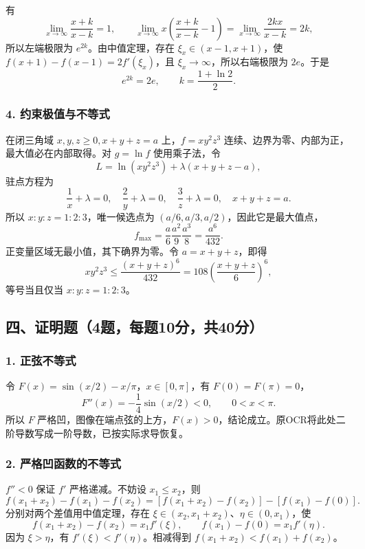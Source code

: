 \documentclass[11pt,fontset=fandol]{ctexart}
\begin{document}
有 \[
\lim_{x\to\infty}\frac{x+k}{x-k}=1,\qquad
\lim_{x\to\infty}x\left(\frac{x+k}{x-k}-1\right)
=\lim_{x\to\infty}\frac{2kx}{x-k}=2k,
\] 所以左端极限为 \(e^{2k}\)。由中值定理，存在 \(\xi_x\in(x-1,x+1)\)，使
\(f(x+1)-f(x-1)=2f'(\xi_x)\)，且 \(\xi_x\to\infty\)，所以右端极限为
\(2e\)。于是 \[
e^{2k}=2e,\qquad k=\frac{1+\ln2}{2}.
\]

\subsubsection{4.
约束极值与不等式}\label{ux7ea6ux675fux6781ux503cux4e0eux4e0dux7b49ux5f0f}

在闭三角域 \(x,y,z\ge0,x+y+z=a\) 上，\(f=xy^2z^3\)
连续、边界为零、内部为正，最大值必在内部取得。对 \(g=\ln f\)
使用乘子法，令 \[
L=\ln(xy^2z^3)+\lambda(x+y+z-a),
\] 驻点方程为 \[
\frac1x+\lambda=0,\quad\frac2y+\lambda=0,\quad
\frac3z+\lambda=0,\quad x+y+z=a.
\] 所以 \(x:y:z=1:2:3\)，唯一候选点为
\((a/6,a/3,a/2)\)，因此它是最大值点， \[
f_{\max}=\frac a6\frac{a^2}{9}\frac{a^3}{8}=\frac{a^6}{432}.
\] 正变量区域无最小值，其下确界为零。令 \(a=x+y+z\)，即得 \[
xy^2z^3\le\frac{(x+y+z)^6}{432}
=108\left(\frac{x+y+z}{6}\right)^6,
\] 等号当且仅当 \(x:y:z=1:2:3\)。

\subsection{四、证明题（4题，每题10分，共40分）}\label{ux56dbux8bc1ux660eux98984ux9898ux6bcfux989810ux5206ux517140ux5206}

\subsubsection{1. 正弦不等式}\label{ux6b63ux5f26ux4e0dux7b49ux5f0f}

令 \(F(x)=\sin(x/2)-x/\pi\)，\(x\in[0,\pi]\)，有 \(F(0)=F(\pi)=0\)， \[
F''(x)=-\frac14\sin(x/2)<0,\qquad 0<x<\pi.
\] 所以 \(F\)
严格凹，图像在端点弦的上方，\(F(x)>0\)，结论成立。原OCR将此处二阶导数写成一阶导数，已按实际求导恢复。

\subsubsection{2.
严格凹函数的不等式}\label{ux4e25ux683cux51f9ux51fdux6570ux7684ux4e0dux7b49ux5f0f}

\(f''<0\) 保证 \(f'\) 严格递减。不妨设 \(x_1\le x_2\)，则 \[
f(x_1+x_2)-f(x_1)-f(x_2)
=[f(x_1+x_2)-f(x_2)]-[f(x_1)-f(0)].
\] 分别对两个差值用中值定理，存在
\(\xi\in(x_2,x_1+x_2)\)、\(\eta\in(0,x_1)\)，使 \[
f(x_1+x_2)-f(x_2)=x_1f'(\xi),\qquad f(x_1)-f(0)=x_1f'(\eta).
\] 因为 \(\xi>\eta\)，有 \(f'(\xi)<f'(\eta)\)。相减得到
\(f(x_1+x_2)<f(x_1)+f(x_2)\)。
\end{document}
